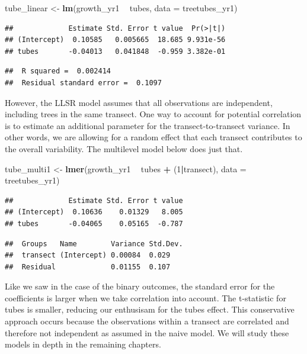 \documentclass[
]{krantz}
\newenvironment{Shaded}{\begin{snugshade}}{\end{snugshade}}
\newcommand{\DataTypeTok}[1]{\textcolor[rgb]{0.27,0.27,0.27}{#1}}
\newcommand{\DecValTok}[1]{\textcolor[rgb]{0.06,0.06,0.06}{#1}}
\newcommand{\KeywordTok}[1]{\textcolor[rgb]{0.27,0.27,0.27}{\textbf{#1}}}
\newcommand{\NormalTok}[1]{#1}
\newcommand{\OperatorTok}[1]{\textcolor[rgb]{0.43,0.43,0.43}{\textbf{#1}}}
\newcommand{\StringTok}[1]{\textcolor[rgb]{0.5,0.5,0.5}{#1}}
\begin{document}
\begin{Shaded}
\begin{Highlighting}[]
\NormalTok{tube_linear <-}\StringTok{ }\KeywordTok{lm}\NormalTok{(growth_yr1 }\OperatorTok{~}\StringTok{ }\NormalTok{tubes, }\DataTypeTok{data =}\NormalTok{ treetubes_yr1)}
\end{Highlighting}
\end{Shaded}

\begin{verbatim}
##             Estimate Std. Error t value  Pr(>|t|)
## (Intercept)  0.10585   0.005665  18.685 9.931e-56
## tubes       -0.04013   0.041848  -0.959 3.382e-01
\end{verbatim}

\begin{verbatim}
##  R squared =  0.002414 
##  Residual standard error =  0.1097
\end{verbatim}

However, the LLSR model assumes that all observations are independent, including trees in the same transect. One way to account for potential correlation is to estimate an additional parameter for the transect-to-transect variance. In other words, we are allowing for a random effect that each transect contributes to the overall variability. The multilevel model below does just that.

\begin{Shaded}
\begin{Highlighting}[]
\NormalTok{tube_multi1 <-}\StringTok{ }\KeywordTok{lmer}\NormalTok{(growth_yr1 }\OperatorTok{~}\StringTok{ }\NormalTok{tubes }\OperatorTok{+}\StringTok{ }\NormalTok{(}\DecValTok{1}\OperatorTok{|}\NormalTok{transect), }
                    \DataTypeTok{data =}\NormalTok{ treetubes_yr1)}
\end{Highlighting}
\end{Shaded}

\begin{verbatim}
##             Estimate Std. Error t value
## (Intercept)  0.10636    0.01329   8.005
## tubes       -0.04065    0.05165  -0.787
\end{verbatim}

\begin{verbatim}
##  Groups   Name        Variance Std.Dev.
##  transect (Intercept) 0.00084  0.029   
##  Residual             0.01155  0.107
\end{verbatim}

Like we saw in the case of the binary outcomes, the standard error for the coefficients is larger when we take correlation into account. The t-statistic for tubes is smaller, reducing our enthusisam for the tubes effect. This conservative approach occurs because the observations within a transect are correlated and therefore not independent as assumed in the naive model. We will study these models in depth in the remaining chapters.
\end{document}
